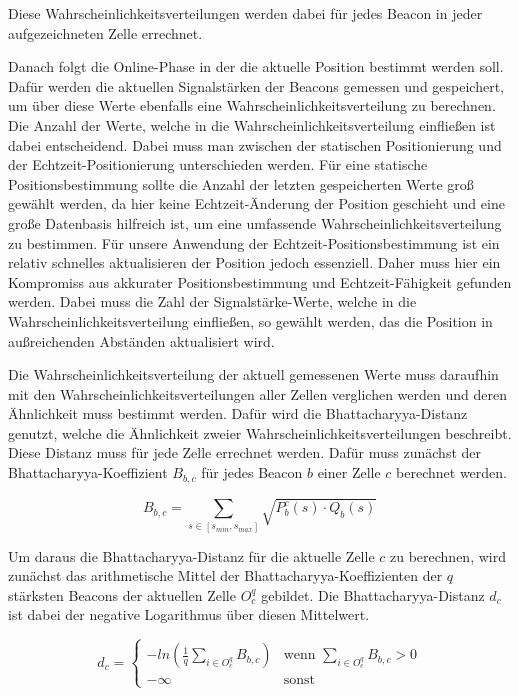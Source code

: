 Diese Wahrscheinlichkeitsverteilungen werden dabei für jedes Beacon in jeder aufgezeichneten Zelle errechnet.

Danach folgt die Online-Phase in der die aktuelle Position bestimmt werden soll. Dafür werden die aktuellen Signalstärken der Beacons gemessen und gespeichert, um über diese Werte ebenfalls eine Wahrscheinlichkeitsverteilung zu berechnen. Die Anzahl der Werte, welche in die Wahrscheinlichkeitsverteilung einfließen ist dabei entscheidend.
Dabei muss man zwischen der statischen Positionierung und der Echtzeit-Positionierung unterschieden werden.
Für eine statische Positionsbestimmung sollte die Anzahl der letzten gespeicherten Werte groß gewählt werden, da hier keine Echtzeit-Änderung der Position geschieht und eine große Datenbasis hilfreich ist, um eine umfassende Wahrscheinlichkeitsverteilung zu bestimmen.
Für unsere Anwendung der Echtzeit-Positionsbestimmung ist ein relativ schnelles aktualisieren der Position jedoch essenziell. Daher muss hier ein Kompromiss aus akkurater Positionsbestimmung und Echtzeit-Fähigkeit gefunden werden. Dabei muss die Zahl der Signalstärke-Werte, welche in die Wahrscheinlichkeitsverteilung einfließen, so gewählt werden, das die Position in außreichenden Abständen aktualisiert wird.

Die Wahrscheinlichkeitsverteilung der aktuell gemessenen Werte muss daraufhin mit den Wahrscheinlichkeitsverteilungen aller Zellen verglichen werden und deren Ähnlichkeit muss bestimmt werden. Dafür wird die Bhattacharyya-Distanz genutzt, welche die Ähnlichkeit zweier Wahrscheinlichkeitsverteilungen beschreibt. 
Diese Distanz muss für jede Zelle errechnet werden. 
Dafür muss zunächst der Bhattacharyya-Koeffizient $B_{b, c}$ für jedes Beacon $b$ einer Zelle $c$ berechnet werden.

\begin{equation}
	B_{b, c} = \sum_{s \in [s_{min},s_{max}]} \sqrt{P_{b}^{c}(s) \cdot Q_{b}(s)}
\end{equation}

Um daraus die Bhattacharyya-Distanz für die aktuelle Zelle $c$ zu berechnen, wird zunächst das arithmetische Mittel der Bhattacharyya-Koeffizienten der $q$ stärksten Beacons der aktuellen Zelle $O_{c}^{q}$ gebildet. Die Bhattacharyya-Distanz $d_{c}$ ist dabei der negative Logarithmus über diesen Mittelwert.

\begin{equation}
	d_{c}= \begin{cases}
	-ln (\frac{1}{q} \sum_{i \in O_{c}^{q}} B_{b, c}) & \text{wenn } \sum_{i \in O_{c}^{q}} B_{b, c} > 0 \\
	- \infty & \text{sonst}
	\end{cases}
\end{equation}

